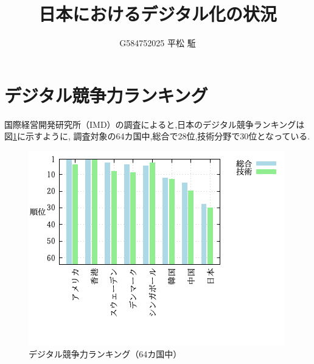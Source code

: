 \documentclass[a4paper,11pt,dvipdfmx]{ujarticle}
\title{日本におけるデジタル化の状況}
\author{G584752025 平松 駈}
\begin{document}
\maketitle %

\section{デジタル競争力ランキング}
国際経営開発研究所（IMD）の調査\cite{oecd}によると,日本のデジタル競争ランキングは図\ref{fig:fig41}に示すように,
調査対象の64カ国中,総合で28位,技術分野で30位となっている.


\begin{figure}[htbp]
\centering
\includegraphics{fig41.png}
\caption{デジタル競争力ランキング（64カ国中）}\label{fig:fig41}

\end{figure}
\begin{figure}[htbp]
\end{figure}


\newpage



\end{document}

